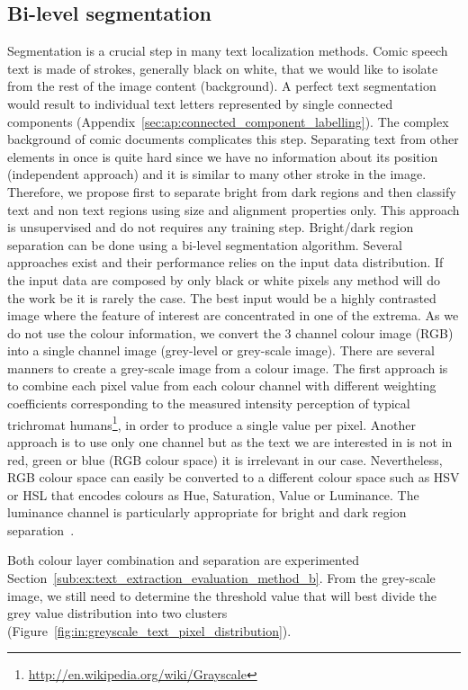 \subsection{Bi-level segmentation}
\label{sec:in:segmentation}
Segmentation is a crucial step in many text localization methods.
Comic speech text is made of strokes, generally black on white, that we would like to isolate from the rest of the image content (background).
A perfect text segmentation would result to individual text letters represented by single connected components (Appendix~\ref{sec:ap:connected_component_labelling}).
The complex background of comic documents complicates this step.
Separating text from other elements in once is quite hard since we have no information about its position (independent approach) and it is similar to many other stroke in the image.
Therefore, we propose first to separate bright from dark regions and then classify text and non text regions using size and alignment properties only.
This approach is unsupervised and do not requires any training step.
Bright/dark region separation can be done using a bi-level segmentation algorithm.
Several approaches exist and their performance relies on the input data distribution.
If the input data are composed by only black or white pixels any method will do the work be it is rarely the case.
The best input would be a highly contrasted image where the feature of interest are concentrated in one of the extrema.
As we do not use the colour information, we convert the 3 channel colour image (RGB) into a single channel image (grey-level or grey-scale image).
There are several manners to create a grey-scale image from a colour image.
The first approach is to combine each pixel value from each colour channel with different weighting coefficients corresponding to the measured intensity perception of typical trichromat humans\footnote{\url{http://en.wikipedia.org/wiki/Grayscale}}, in order to produce a single value per pixel.
Another approach is to use only one channel but as the text we are interested in is not in red, green or blue (RGB colour space) it is irrelevant in our case.
Nevertheless, RGB colour space can easily be converted to a different colour space such as HSV or HSL that encodes colours as Hue, Saturation, Value or Luminance.
The luminance channel is particularly appropriate for bright and dark region separation~\cite{Ho2012}.

Both colour layer combination and separation are experimented Section~\ref{sub:ex:text_extraction_evaluation_method_b}.
From the grey-scale image, we still need to determine the threshold value that will best divide the grey value distribution into two clusters (Figure~\ref{fig:in:greyscale_text_pixel_distribution}).


